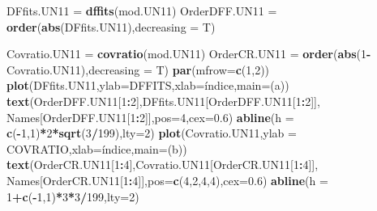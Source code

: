 \documentclass[
]{article}
\newenvironment{Shaded}{\begin{snugshade}}{\end{snugshade}}
\newcommand{\AttributeTok}[1]{\textcolor[rgb]{0.13,0.29,0.53}{#1}}
\newcommand{\DecValTok}[1]{\textcolor[rgb]{0.00,0.00,0.81}{#1}}
\newcommand{\FloatTok}[1]{\textcolor[rgb]{0.00,0.00,0.81}{#1}}
\newcommand{\FunctionTok}[1]{\textcolor[rgb]{0.13,0.29,0.53}{\textbf{#1}}}
\newcommand{\NormalTok}[1]{#1}
\newcommand{\OtherTok}[1]{\textcolor[rgb]{0.56,0.35,0.01}{#1}}
\newcommand{\SpecialCharTok}[1]{\textcolor[rgb]{0.81,0.36,0.00}{\textbf{#1}}}
\newcommand{\StringTok}[1]{\textcolor[rgb]{0.31,0.60,0.02}{#1}}
\begin{document}
\begin{Shaded}
\begin{Highlighting}[]
\NormalTok{DFfits.UN11 }\OtherTok{=} \FunctionTok{dffits}\NormalTok{(mod.UN11)}
\NormalTok{OrderDFF.UN11 }\OtherTok{=} \FunctionTok{order}\NormalTok{(}\FunctionTok{abs}\NormalTok{(DFfits.UN11),}\AttributeTok{decreasing =}\NormalTok{ T)}

\NormalTok{Covratio.UN11 }\OtherTok{=} \FunctionTok{covratio}\NormalTok{(mod.UN11)}
\NormalTok{OrderCR.UN11 }\OtherTok{=} \FunctionTok{order}\NormalTok{(}\FunctionTok{abs}\NormalTok{(}\DecValTok{1}\SpecialCharTok{{-}}\NormalTok{Covratio.UN11),}\AttributeTok{decreasing =}\NormalTok{ T)}
\FunctionTok{par}\NormalTok{(}\AttributeTok{mfrow=}\FunctionTok{c}\NormalTok{(}\DecValTok{1}\NormalTok{,}\DecValTok{2}\NormalTok{))}
\FunctionTok{plot}\NormalTok{(DFfits.UN11,}\AttributeTok{ylab=}\StringTok{\textquotesingle{}DFFITS\textquotesingle{}}\NormalTok{,}\AttributeTok{xlab=}\StringTok{\textquotesingle{}índice\textquotesingle{}}\NormalTok{,}\AttributeTok{main=}\StringTok{\textquotesingle{}(a)\textquotesingle{}}\NormalTok{)}
\FunctionTok{text}\NormalTok{(OrderDFF.UN11[}\DecValTok{1}\SpecialCharTok{:}\DecValTok{2}\NormalTok{],DFfits.UN11[OrderDFF.UN11[}\DecValTok{1}\SpecialCharTok{:}\DecValTok{2}\NormalTok{]],}
\NormalTok{     Names[OrderDFF.UN11[}\DecValTok{1}\SpecialCharTok{:}\DecValTok{2}\NormalTok{]],}\AttributeTok{pos=}\DecValTok{4}\NormalTok{,}\AttributeTok{cex=}\FloatTok{0.6}\NormalTok{)}
\FunctionTok{abline}\NormalTok{(}\AttributeTok{h =} \FunctionTok{c}\NormalTok{(}\SpecialCharTok{{-}}\DecValTok{1}\NormalTok{,}\DecValTok{1}\NormalTok{)}\SpecialCharTok{*}\DecValTok{2}\SpecialCharTok{*}\FunctionTok{sqrt}\NormalTok{(}\DecValTok{3}\SpecialCharTok{/}\DecValTok{199}\NormalTok{),}\AttributeTok{lty=}\DecValTok{2}\NormalTok{)}
\FunctionTok{plot}\NormalTok{(Covratio.UN11,}\AttributeTok{ylab =} \StringTok{\textquotesingle{}COVRATIO\textquotesingle{}}\NormalTok{,}\AttributeTok{xlab=}\StringTok{\textquotesingle{}índice\textquotesingle{}}\NormalTok{,}\AttributeTok{main=}\StringTok{\textquotesingle{}(b)\textquotesingle{}}\NormalTok{)}
\FunctionTok{text}\NormalTok{(OrderCR.UN11[}\DecValTok{1}\SpecialCharTok{:}\DecValTok{4}\NormalTok{],Covratio.UN11[OrderCR.UN11[}\DecValTok{1}\SpecialCharTok{:}\DecValTok{4}\NormalTok{]],}
\NormalTok{     Names[OrderCR.UN11[}\DecValTok{1}\SpecialCharTok{:}\DecValTok{4}\NormalTok{]],}\AttributeTok{pos=}\FunctionTok{c}\NormalTok{(}\DecValTok{4}\NormalTok{,}\DecValTok{2}\NormalTok{,}\DecValTok{4}\NormalTok{,}\DecValTok{4}\NormalTok{),}\AttributeTok{cex=}\FloatTok{0.6}\NormalTok{)}
\FunctionTok{abline}\NormalTok{(}\AttributeTok{h =} \DecValTok{1}\SpecialCharTok{+}\FunctionTok{c}\NormalTok{(}\SpecialCharTok{{-}}\DecValTok{1}\NormalTok{,}\DecValTok{1}\NormalTok{)}\SpecialCharTok{*}\DecValTok{3}\SpecialCharTok{*}\DecValTok{3}\SpecialCharTok{/}\DecValTok{199}\NormalTok{,}\AttributeTok{lty=}\DecValTok{2}\NormalTok{)}
\end{Highlighting}
\end{Shaded}
\end{document}
